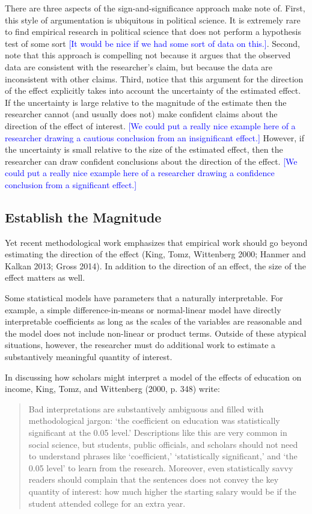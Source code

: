 \documentclass[12pt]{article}
\newcommand{\kelly}[1]{\textcolor{blue}{#1}}
\begin{document}
There are three aspects of the sign-and-significance approach make note of. First, this style of argumentation is ubiquitous in political science. It is extremely rare to find empirical research in political science that does not perform a hypothesis test of some sort \kelly{[It would be nice if we had some sort of data on this.]}. Second, note that this approach is compelling not because it argues that the observed data are consistent with the researcher's claim, but because the data are inconsistent with other claims. Third, notice that this argument for the direction of the effect explicitly takes into account the uncertainty of the estimated effect. If the uncertainty is large relative to the magnitude of the estimate then the researcher cannot (and usually does not) make confident claims about the direction of the effect of interest. \kelly{[We could put a really nice example here of a researcher drawing a cautious conclusion from an insignificant effect.]} However, if the uncertainty is small relative to the size of the estimated effect, then the researcher can draw confident conclusions about the direction of the effect. \kelly{[We could put a really nice example here of a researcher drawing a confidence conclusion from a significant effect.]}

\subsection*{Establish the Magnitude}

Yet recent methodological work emphasizes that empirical work should go beyond estimating the direction of the effect (King, Tomz, Wittenberg 2000; Hanmer and Kalkan 2013; Gross 2014). In addition to the direction of an effect, the size of the effect matters as well. 

Some statistical models have parameters that a naturally interpretable. For example, a simple difference-in-means or normal-linear model have directly interpretable coefficients as long as the scales of the variables are reasonable and the model does not include non-linear or product terms. Outside of these atypical situations, however, the researcher must do additional work to estimate a substantively meaningful quantity of interest.

In discussing how scholars might interpret a model of the effects of education on income, King, Tomz, and Wittenberg (2000, p. 348) write:

\begin{quote}
Bad interpretations are substantively ambiguous and filled with methodological jargon: `the coefficient on education was statistically significant at the 0.05 level.' Descriptions like this are very common in social science, but students, public officials, and scholars should not need to understand phrases like `coefficient,' `statistically significant,' and `the 0.05 level' to learn from the research. Moreover, even statistically savvy readers should complain that the sentences does not convey the key quantity of interest: how much higher the starting salary would be if the student attended college for an extra year.
\end{quote}
\end{document}
